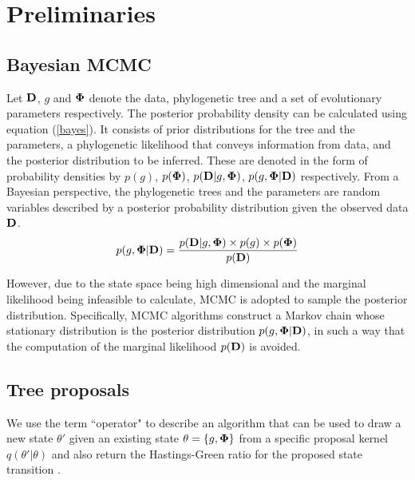 \documentclass{bmcart}
\begin{document}
\section*{Preliminaries}
\subsection*{Bayesian MCMC}
Let $\bf{D}$, $g$ and $\bf{\Phi}$ denote the data, phylogenetic tree and a set of evolutionary parameters respectively. The posterior probability density can be calculated using equation (\ref{bayes}). It consists of prior distributions for the  tree and the parameters, a phylogenetic likelihood that conveys information from data, and the posterior distribution to be inferred. These are denoted in the form of probability densities by $p(g) $, $p(\bf{\Phi})$, $p({\bf{D}}|g,\bf{\Phi} )$, $p(g,{\bf{\Phi}}|{\bf{D}})$ respectively. From a Bayesian perspective, the phylogenetic trees and the parameters are random variables described by a posterior probability distribution given the observed data ${\bf{D}}$.
\begin{equation}\label{bayes}
p(g,{\bf{\Phi}} |{\bf{D}}) = \frac{{p ({\bf{D}}|g,{\bf{\Phi}} ) \times p (g) \times p ({\bf{\Phi}} )}}{{p (\bf{D})}}
\end{equation}

However, due to the state space being high dimensional and the marginal likelihood being infeasible to calculate, MCMC is adopted to sample the posterior distribution. Specifically, MCMC algorithms construct a Markov chain whose stationary distribution is the posterior distribution $p(g,{\bf{\Phi}} |{\bf{D}})$, in such a way that the computation of the marginal likelihood $p ({\bf{D}})$ is avoided.
\subsection*{Tree proposals}
\label{treeproposals}
We use the term ``operator" to describe an algorithm that can be used to draw a new state $\theta'$ given an existing state $\theta = \{g,{\bf{\Phi}}\}$ from a specific proposal kernel $q(\theta'|\theta)$ and also return the Hastings-Green ratio for the proposed state transition \cite{hastings1970monte,green1995reversible}.
\end{document}
